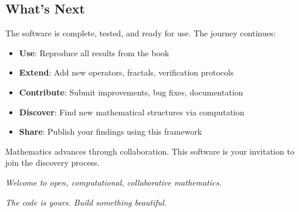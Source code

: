 \subsection{What's Next}

The software is complete, tested, and ready for use. The journey continues:

\begin{itemize}
\item \textbf{Use}: Reproduce all results from the book
\item \textbf{Extend}: Add new operators, fractals, verification protocols
\item \textbf{Contribute}: Submit improvements, bug fixes, documentation
\item \textbf{Discover}: Find new mathematical structures via computation
\item \textbf{Share}: Publish your findings using this framework
\end{itemize}

Mathematics advances through collaboration. This software is your invitation to join the discovery process.

\vspace{1cm}

\noindent\textit{Welcome to open, computational, collaborative mathematics.}

\noindent\textit{The code is yours. Build something beautiful.}

